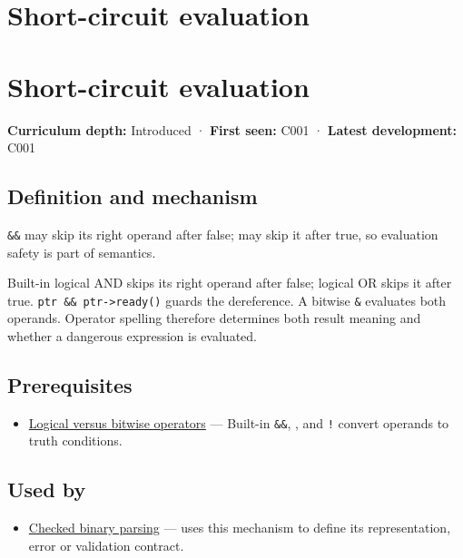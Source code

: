 \hypertarget{appendix-2e245a6fa8d3}{}
\section*{Short-circuit evaluation}
\section{Short-circuit evaluation}\label{appendix-2e245a6fa8d3-short-circuit-evaluation}

\textbf{Curriculum depth:} Introduced · \textbf{First seen:} C001 · \textbf{Latest development:} C001

\subsection{Definition and mechanism}\label{appendix-2e245a6fa8d3-definition-and-mechanism}

\texttt{\&\&} may skip its right operand after false; \texttt{\textbar{}\textbar{}} may skip it after true, so evaluation safety is part of semantics.

Built-in logical AND skips its right operand after false; logical OR skips it after true. \texttt{ptr\ \&\&\ ptr-\textgreater{}ready()} guards the dereference. A bitwise \texttt{\&} evaluates both operands. Operator spelling therefore determines both result meaning and whether a dangerous expression is evaluated.

\subsection{Prerequisites}\label{appendix-2e245a6fa8d3-prerequisites}

\begin{itemize}
\tightlist
\item
  \hyperref[appendix-fe6b457d68d8]{Logical versus bitwise operators} --- Built-in \texttt{\&\&}, \texttt{\textbar{}\textbar{}}, and \texttt{!} convert operands to truth conditions.
\end{itemize}

\subsection{Used by}\label{appendix-2e245a6fa8d3-used-by}

\begin{itemize}
\tightlist
\item
  \hyperref[appendix-652d81568de9]{Checked binary parsing} --- uses this mechanism to define its representation, error or validation contract.
\end{itemize}

